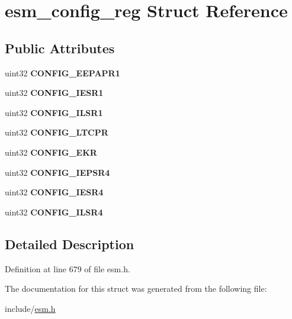 \hypertarget{structesm__config__reg}{}\section{esm\+\_\+config\+\_\+reg Struct Reference}
\label{structesm__config__reg}
\subsection*{Public Attributes}
\begin{DoxyCompactItemize}
\item 
\mbox{\label{structesm__config__reg_aef3c4dc4feaf0fd7dc5a51829b08d53f}} 
uint32 {\bfseries C\+O\+N\+F\+I\+G\+\_\+\+E\+E\+P\+A\+P\+R1}
\item 
\mbox{\label{structesm__config__reg_a3ba016e2a4dadb283f05fd587da98aaa}} 
uint32 {\bfseries C\+O\+N\+F\+I\+G\+\_\+\+I\+E\+S\+R1}
\item 
\mbox{\label{structesm__config__reg_a2a6f377b457fc36b5029dfc9465724b6}} 
uint32 {\bfseries C\+O\+N\+F\+I\+G\+\_\+\+I\+L\+S\+R1}
\item 
\mbox{\label{structesm__config__reg_a1852c9ff1cc4336fe8c991d3a9f32880}} 
uint32 {\bfseries C\+O\+N\+F\+I\+G\+\_\+\+L\+T\+C\+PR}
\item 
\mbox{\label{structesm__config__reg_a35b3ffe76ad5b273cfdd2d6dc804131f}} 
uint32 {\bfseries C\+O\+N\+F\+I\+G\+\_\+\+E\+KR}
\item 
\mbox{\label{structesm__config__reg_ab9193b658820f0838dc703daa7685ac4}} 
uint32 {\bfseries C\+O\+N\+F\+I\+G\+\_\+\+I\+E\+P\+S\+R4}
\item 
\mbox{\label{structesm__config__reg_ad67cff760bd5dff6bcbef850fac6e6c2}} 
uint32 {\bfseries C\+O\+N\+F\+I\+G\+\_\+\+I\+E\+S\+R4}
\item 
\mbox{\label{structesm__config__reg_a413f21f9102624979cd25becab200b0e}} 
uint32 {\bfseries C\+O\+N\+F\+I\+G\+\_\+\+I\+L\+S\+R4}
\end{DoxyCompactItemize}


\subsection{Detailed Description}


Definition at line 679 of file esm.\+h.



The documentation for this struct was generated from the following file\+:\begin{DoxyCompactItemize}
\item 
include/\mbox{\hyperlink{esm_8h}{esm.\+h}}\end{DoxyCompactItemize}
